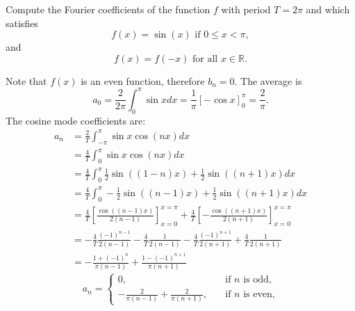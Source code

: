 \documentclass[11pt]{article}
\begin{document}
\begin{solution}
\begin{itemize}
    
\end{itemize}
\end{solution}


\begin{exercise}
    Compute the Fourier coefficients of the function $f$ with period $T = 2\pi$ and which satisfies 
     \[
        f(x) = \sin(x) \text{ if } 0 \leq x  < \pi,
     \]
     and 
     \[
        f(x) = f(-x) \text{ for all } x \in \mathbb R.
     \]
\end{exercise}
\begin{solution}     
    Note that $f(x)$ is an even function,
    therefore $b_n = 0$. 
    The average is 
	\[
        a_0 = \frac{2}{2\pi} \int_{0}^{\pi} \sin x dx  =  \frac{1}{\pi}\left[ - \cos{x} \right]_{0}^{\pi} =\frac{2}{\pi} .
    \]
    The cosine mode coefficients are:
    \begin{align*}
            a_n 
            &
            = 
            \frac{2}{T}
            \int_{-\pi}^{\pi} \sin x \cos(n x) dx
            \\&
            = 
            \frac{4}{T}
            \int_{0}^{\pi} \sin x \cos(n x) dx
            \\&
            =
            \frac{4}{T}
            \int_{0}^{\pi} \frac 1 2 \sin((1-n)x) + \frac 1 2 \sin((n+1)x) dx
            \\&
		=
            \frac{4}{T}
            \int_{0}^{\pi} -\frac 1 2 \sin((n-1)x) + \frac 1 2 \sin((n+1)x) dx
            \\&
            =
           \frac{4}{T}
            \left[\frac{ \cos((n-1)x) }{ 2(n-1) } \right]_{x=0}^{x=\pi}
            +
            \frac{4}{T}
            \left[- \frac{ \cos((n+1)x) }{ 2(n+1) } \right]_{x=0}^{x=\pi}
            \\&
            = 
            -\frac 4 T \frac{(-1)^{n-1}}{2(n-1)} - \frac 4 T \frac{1}{2(n-1)}  -\frac 4 T \frac{(-1)^{n+1}}{2(n+1)} + \frac 4 T \frac{1}{2(n+1)}
            \\&
            = -\frac{1+(-1)^{n}}{\pi(n-1)} +  \frac{1-(-1)^{n+1}}{\pi(n+1)} 
        \end{align*}	
        \[
            a_n = 
            \begin{cases}
            0 ,\quad &\text{if } n\text{ is odd,}\\
            -\frac{2}{\pi(n-1)} + \frac{2}{\pi(n+1)}  ,\quad &\text{if } n\text{ is even,}
            \end{cases}
        \]
\end{solution}
\end{document}

